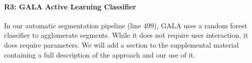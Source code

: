 \documentclass[10pt,twocolumn,letterpaper]{article}
\begin{document}
\vspace{-5mm}

\paragraph{R3: GALA Active Learning Classifier}
In our automatic segmentation pipeline (line 499), GALA uses a random forest classifier to agglomerate segments. While it does not require user interaction, it does require parameters. We will add a section to the supplemental material containing a full description of the approach and our use of it. %

%
%
\end{document}
